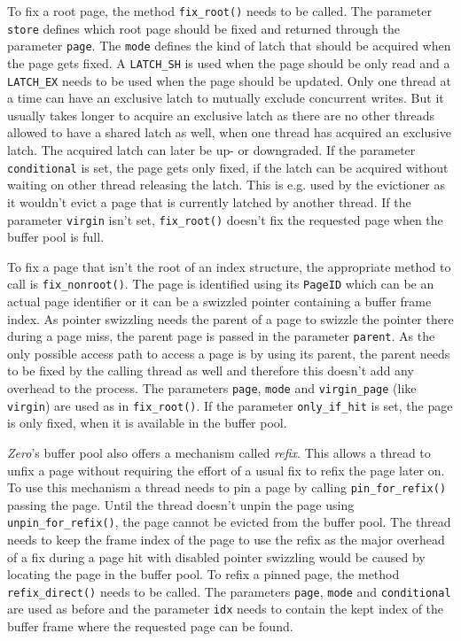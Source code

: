 	To fix a root page, the method \lstinline{fix_root()} needs to be called. The parameter \lstinline{store} defines which root page should be fixed and returned through the parameter \lstinline{page}. The \lstinline{mode} defines the kind of latch that should be acquired when the page gets fixed. A \lstinline{LATCH_SH} is used when the page should be only read and a \lstinline{LATCH_EX} needs to be used when the page should be updated. Only one thread at a time can have an exclusive latch to mutually exclude concurrent writes. But it usually takes longer to acquire an exclusive latch as there are no other threads allowed to have a shared latch as well, when one thread has acquired an exclusive latch. The acquired latch can later be up- or downgraded. If the parameter \lstinline{conditional} is set, the page gets only fixed, if the latch can be acquired without waiting on other thread releasing the latch. This is e.g. used by the evictioner as it wouldn't evict a page that is currently latched by another thread. If the parameter \lstinline{virgin} isn't set, \lstinline{fix_root()} doesn't fix the requested page when the buffer pool is full.
	
	To fix a page that isn't the root of an index structure, the appropriate method to call is \lstinline{fix_nonroot()}. The page is identified using its \lstinline{PageID} which can be an actual page identifier or it can be a swizzled pointer containing a buffer frame index. As pointer swizzling needs the parent of a page to swizzle the pointer there during a page miss, the parent page is passed in the parameter \lstinline{parent}. As the only possible access path to access a page is by using its parent, the parent needs to be fixed by the calling thread as well and therefore this doesn't add any overhead to the process. The parameters \lstinline{page}, \lstinline{mode} and \lstinline{virgin_page} (like \lstinline{virgin}) are used as in \lstinline{fix_root()}. If the parameter \lstinline{only_if_hit} is set, the page is only fixed, when it is available in the buffer pool.
	
	\emph{Zero}'s buffer pool also offers a mechanism called \emph{refix}. This allows a thread to unfix a page without requiring the effort of a usual fix to refix the page later on. To use this mechanism a thread needs to pin a page by calling \lstinline{pin_for_refix()} passing the page. Until the thread doesn't unpin the page using \lstinline{unpin_for_refix()}, the page cannot be evicted from the buffer pool. The thread needs to keep the frame index of the page to use the refix as the major overhead of a fix during a page hit with disabled pointer swizzling would be caused by locating the page in the buffer pool. To refix a pinned page, the method \lstinline{refix_direct()} needs to be called. The parameters \lstinline{page}, \lstinline{mode} and \lstinline{conditional} are used as before and the parameter \lstinline{idx} needs to contain the kept index of the buffer frame where the requested page can be found.
	
